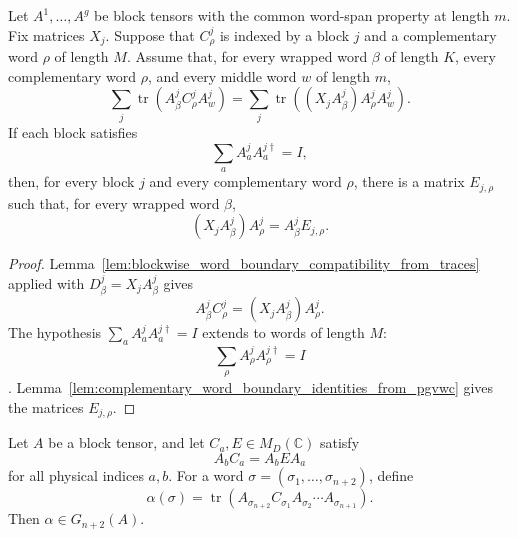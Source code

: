 \begin{lemma}
    \label{lem:complementary_word_boundary_identities_from_trace_decompositions}
    \leanok
    Let \(A^1,\ldots,A^g\) be block tensors with the common word-span property
    at length \(m\). Fix matrices \(X_j\). Suppose that \(C^j_\rho\) is indexed
    by a block \(j\) and a complementary word \(\rho\) of length \(M\). Assume
    that, for every wrapped word \(\beta\) of length \(K\), every complementary
    word \(\rho\), and every middle word \(w\) of length \(m\),
    \[
        \sum_j\operatorname{tr}\!\left(A^j_\beta C^j_\rho A^j_w\right)
        =
        \sum_j\operatorname{tr}\!\left((X_jA^j_\beta)A^j_\rho A^j_w\right).
    \]
    If each block satisfies
    \[
        \sum_a A^j_aA^{j\dagger}_a=I,
    \]
    then, for every block \(j\) and every complementary word \(\rho\), there is
    a matrix \(E_{j,\rho}\) such that, for every wrapped word \(\beta\),
    \[
        (X_jA^j_\beta)A^j_\rho=A^j_\beta E_{j,\rho}.
    \]
\end{lemma}

\begin{proof}
    \leanok
    Lemma~\ref{lem:blockwise_word_boundary_compatibility_from_traces} applied
    with \(D^j_\beta=X_jA^j_\beta\) gives
    \[
        A^j_\beta C^j_\rho=(X_jA^j_\beta)A^j_\rho.
    \]
    The hypothesis \(\sum_a A^j_a A^{j\dagger}_a=I\) extends to words of
    length \(M\):
    \[
        \sum_\rho A^j_\rho A^{j\dagger}_\rho=I
    \].
    Lemma~\ref{lem:complementary_word_boundary_identities_from_pgvwc} gives the
    matrices \(E_{j,\rho}\).
\end{proof}

\begin{lemma}
    \label{lem:left_boundary_component_mem_ground_space}
    \leanok
    Let \(A\) be a block tensor, and let \(C_a,E\in M_D(\mathbb C)\)
    satisfy
    \[
        A_b C_a=A_bEA_a
    \]
    for all physical indices \(a,b\).  For a word
    \(\sigma=(\sigma_1,\ldots,\sigma_{n+2})\), define
    \[
        \alpha(\sigma)
        =
        \operatorname{tr}\!\left(
        A_{\sigma_{n+2}} C_{\sigma_1}
        A_{\sigma_2}\cdots A_{\sigma_{n+1}}
        \right).
    \]
    Then \(\alpha\in G_{n+2}(A)\).
\end{lemma}

